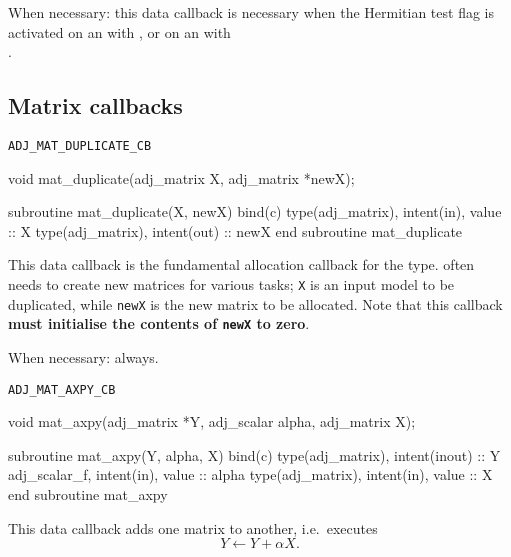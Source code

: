 When necessary: this data callback is necessary when the Hermitian test flag is
activated on an  with ,
or on an  with \\.

\subsection{Matrix callbacks} \label{sec:matrix_callbacks}
\begin{boxwithtitle}{\texttt{ADJ_MAT_DUPLICATE_CB}}
\begin{minipage}{\columnwidth}
\begin{ccode}
  void mat_duplicate(adj_matrix X, adj_matrix *newX);
\end{ccode}
\begin{fortrancode}
  subroutine mat_duplicate(X, newX) bind(c)
    type(adj_matrix), intent(in), value :: X
    type(adj_matrix), intent(out) :: newX
  end subroutine mat_duplicate
\end{fortrancode}
\end{minipage}
\end{boxwithtitle}
This data callback is the fundamental allocation callback for the  type. \libadjoint
often needs to create new matrices for various tasks; \texttt{X} is an
input model  to be duplicated, while \texttt{newX} is the new matrix
to be allocated. Note that this callback \textbf{must initialise the contents of \texttt{newX} to zero}.

When necessary: always.
\begin{boxwithtitle}{\texttt{ADJ_MAT_AXPY_CB}}
\begin{minipage}{\columnwidth}
\begin{ccode}
  void mat_axpy(adj_matrix *Y, adj_scalar alpha, adj_matrix X);
\end{ccode}
\begin{fortrancode}
  subroutine mat_axpy(Y, alpha, X) bind(c)
    type(adj_matrix), intent(inout) :: Y
    adj_scalar_f, intent(in), value :: alpha
    type(adj_matrix), intent(in), value :: X
  end subroutine mat_axpy
\end{fortrancode}
\end{minipage}
\end{boxwithtitle}
This data callback adds one matrix to another, i.e.\ executes
\begin{equation*}
Y \leftarrow Y + \alpha X.
\end{equation*}

